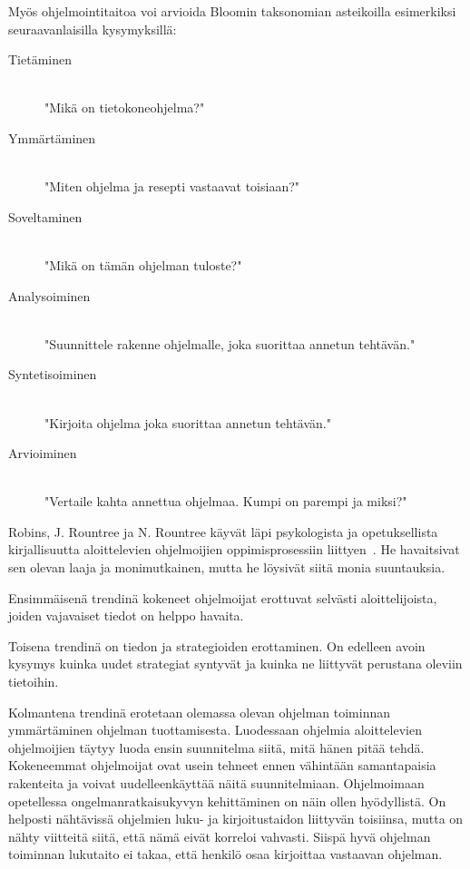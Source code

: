 \documentclass[finnish]{../tktltiki2}
\theoremstyle{definition}
\theoremstyle{remark}
\begin{document}
Myös ohjelmointitaitoa voi arvioida Bloomin taksonomian asteikoilla esimerkiksi seuraavanlaisilla kysymyksillä:

\begin{description}
  \item[Tietäminen] \hfill \\
  "Mikä on tietokoneohjelma?"
  \item[Ymmärtäminen] \hfill \\
  "Miten ohjelma ja resepti vastaavat toisiaan?"
  \item[Soveltaminen] \hfill \\
  "Mikä on tämän ohjelman tuloste?"
  \item[Analysoiminen] \hfill \\
  "Suunnittele rakenne ohjelmalle, joka suorittaa annetun tehtävän."
  \item[Syntetisoiminen] \hfill \\
  "Kirjoita ohjelma joka suorittaa annetun tehtävän."
  \item[Arvioiminen] \hfill \\
  "Vertaile kahta annettua ohjelmaa. Kumpi on parempi ja miksi?"
\end{description}

Robins, J. Rountree ja N. Rountree käyvät läpi psykologista ja opetuksellista kirjallisuutta aloittelevien ohjelmoijien oppimisprosessiin liittyen~\cite{RRR03}. He havaitsivat sen olevan laaja ja monimutkainen, mutta he löysivät siitä monia suuntauksia.

Ensimmäisenä trendinä kokeneet ohjelmoijat erottuvat selvästi aloittelijoista, joiden vajavaiset tiedot on helppo havaita.

Toisena trendinä on tiedon ja strategioiden erottaminen. On edelleen avoin kysymys kuinka uudet strategiat syntyvät ja kuinka ne liittyvät perustana oleviin tietoihin.

Kolmantena trendinä erotetaan olemassa olevan ohjelman toiminnan ymmärtäminen ohjelman tuottamisesta. Luodessaan ohjelmia aloittelevien ohjelmoijien täytyy luoda ensin suunnitelma siitä, mitä hänen pitää tehdä. Kokeneemmat ohjelmoijat ovat usein tehneet ennen vähintään samantapaisia rakenteita ja voivat uudelleenkäyttää näitä suunnitelmiaan. Ohjelmoimaan opetellessa ongelmanratkaisukyvyn kehittäminen on näin ollen hyödyllistä. On helposti nähtävissä ohjelmien luku- ja kirjoitustaidon liittyvän toisiinsa, mutta on nähty viitteitä siitä, että nämä eivät korreloi vahvasti. Siispä hyvä ohjelman toiminnan lukutaito ei takaa, että henkilö osaa kirjoittaa vastaavan ohjelman.
\end{document}
